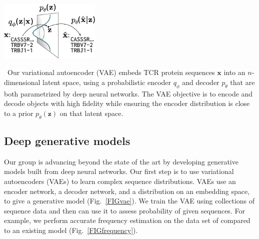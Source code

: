 \documentclass[nobib]{tufte-handout}
\begin{document}
\begin{marginfigure}[0.1in]%
\begin{centering}
    \includegraphics[width=1.9in]{figures/vae.pdf}
\end{centering}
  \caption{\
    Our variational autoencoder (VAE) embeds TCR protein sequences $\mathbf{x}$ into an $n$-dimensional latent space, using a probabilistic encoder $q_\phi$ and decoder $p_\theta$ that are both parametrized by deep neural networks.
The VAE objective is to encode and decode objects with high fidelity while ensuring the encoder distribution is close to a prior $p_\theta(\mathbf{z})$ on that latent space.
    }
  \label{FIGvae}
\end{marginfigure}%



\subsection*{Deep generative models}
Our group is advancing beyond the state of the art by developing generative models built from deep neural networks.
Our first step is to use variational autoencoders (VAEs) \cite{Kingma2014-mo} to learn complex sequence distributions.
VAEs use an encoder network, a decoder network, and a distribution on an embedding space, to give a generative model (Fig.~\ref{FIGvae}).
We train the VAE using collections of sequence data and then can use it to assess probability of given sequences.
For example, we perform accurate frequency estimation on the data set of \cite{Emerson2017-co} compared to an existing model (Fig.~\ref{FIGfrequency}).
\end{document}
